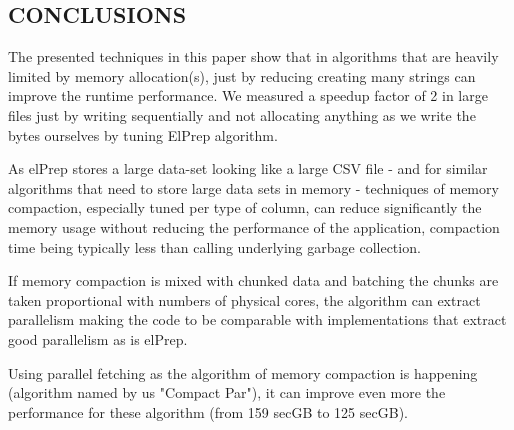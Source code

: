 \documentclass[a4paper,twoside]{article}
\begin{document}
\subsection{\uppercase{Conclusions}}\label{subsec:uppercase2}

The presented techniques in this paper show that in algorithms that are heavily limited by memory allocation(s), just by reducing creating many strings can improve the runtime performance.
We measured a speedup factor of 2 in large files just by writing sequentially and not allocating anything as we write the bytes ourselves by tuning ElPrep algorithm.

As elPrep stores a large data-set looking like a large CSV file - and for similar algorithms that need to store large data sets in memory - techniques of memory compaction, especially tuned per type of column, can reduce significantly the memory usage without reducing
the performance of the application, compaction time being typically less than calling underlying garbage collection.

If memory compaction is mixed with chunked data and batching the chunks are taken proportional with numbers of physical cores, the algorithm can extract parallelism making the code to be comparable with implementations that extract good parallelism as is elPrep.

Using parallel fetching as the algorithm of memory compaction is happening (algorithm named by us "Compact Par"), it can improve even more the performance for these algorithm (from 159 secGB to 125 secGB).
\end{document}
